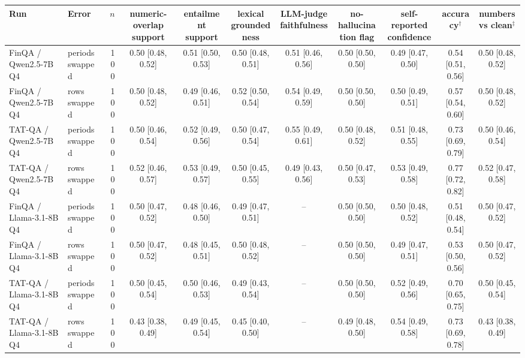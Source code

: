 \begin{tabular}{@{}l l r cccccccc@{}}
\toprule
Run & Error & $n$ & numeric-overlap support & entailment support & lexical groundedness & LLM-judge faithfulness & no-hallucination flag & self-reported confidence & accuracy$^\dagger$ & numbers vs clean$^\ddagger$ \\
\midrule
FinQA / Qwen2.5-7B Q4 & periods swapped & 100 & 0.50 \small[0.48, 0.52] & 0.51 \small[0.50, 0.53] & 0.50 \small[0.48, 0.51] & 0.51 \small[0.46, 0.56] & 0.50 \small[0.50, 0.50] & 0.49 \small[0.47, 0.50] & 0.54 \small[0.51, 0.56] & 0.50 \small[0.48, 0.52] \\
FinQA / Qwen2.5-7B Q4 & rows swapped & 100 & 0.50 \small[0.48, 0.52] & 0.49 \small[0.46, 0.51] & 0.52 \small[0.50, 0.54] & 0.54 \small[0.49, 0.59] & 0.50 \small[0.50, 0.50] & 0.50 \small[0.49, 0.51] & 0.57 \small[0.54, 0.60] & 0.50 \small[0.48, 0.52] \\
TAT-QA / Qwen2.5-7B Q4 & periods swapped & 100 & 0.50 \small[0.46, 0.54] & 0.52 \small[0.49, 0.56] & 0.50 \small[0.47, 0.54] & 0.55 \small[0.49, 0.61] & 0.50 \small[0.48, 0.52] & 0.51 \small[0.48, 0.55] & 0.73 \small[0.69, 0.79] & 0.50 \small[0.46, 0.54] \\
TAT-QA / Qwen2.5-7B Q4 & rows swapped & 100 & 0.52 \small[0.46, 0.57] & 0.53 \small[0.49, 0.57] & 0.50 \small[0.45, 0.55] & 0.49 \small[0.43, 0.56] & 0.50 \small[0.47, 0.53] & 0.53 \small[0.49, 0.58] & 0.77 \small[0.72, 0.82] & 0.52 \small[0.47, 0.58] \\
FinQA / Llama-3.1-8B Q4 & periods swapped & 100 & 0.50 \small[0.47, 0.52] & 0.48 \small[0.46, 0.50] & 0.49 \small[0.47, 0.51] & -- & 0.50 \small[0.50, 0.50] & 0.50 \small[0.48, 0.52] & 0.51 \small[0.48, 0.54] & 0.50 \small[0.47, 0.52] \\
FinQA / Llama-3.1-8B Q4 & rows swapped & 100 & 0.50 \small[0.47, 0.52] & 0.48 \small[0.45, 0.51] & 0.50 \small[0.48, 0.52] & -- & 0.50 \small[0.50, 0.50] & 0.49 \small[0.47, 0.51] & 0.53 \small[0.50, 0.56] & 0.50 \small[0.47, 0.52] \\
TAT-QA / Llama-3.1-8B Q4 & periods swapped & 100 & 0.50 \small[0.45, 0.54] & 0.50 \small[0.46, 0.53] & 0.49 \small[0.43, 0.54] & -- & 0.50 \small[0.50, 0.50] & 0.52 \small[0.49, 0.56] & 0.70 \small[0.65, 0.75] & 0.50 \small[0.45, 0.54] \\
TAT-QA / Llama-3.1-8B Q4 & rows swapped & 100 & 0.43 \small[0.38, 0.49] & 0.49 \small[0.45, 0.54] & 0.45 \small[0.40, 0.50] & -- & 0.49 \small[0.48, 0.50] & 0.54 \small[0.49, 0.58] & 0.73 \small[0.69, 0.78] & 0.43 \small[0.38, 0.49] \\
\bottomrule
\end{tabular}